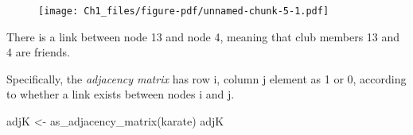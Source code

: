 \documentclass[
  letterpaper,
  DIV=11,
  numbers=noendperiod,
  oneside]{scrreprt}
\newenvironment{Shaded}{\begin{snugshade}}{\end{snugshade}}
\newcommand{\FunctionTok}[1]{\textcolor[rgb]{0.28,0.35,0.67}{#1}}
\newcommand{\NormalTok}[1]{\textcolor[rgb]{0.00,0.23,0.31}{#1}}
\newcommand{\OtherTok}[1]{\textcolor[rgb]{0.00,0.23,0.31}{#1}}
\begin{document}
\begin{figure}[H]

{\centering \texttt{[image: Ch1\_files/figure-pdf/unnamed-chunk-5-1.pdf]}

}

\end{figure}

There is a link between node 13 and node 4, meaning that club members 13
and 4 are friends.{}

Specifically, the \emph{adjacency matrix} has row i, column j element as
1 or 0, according to whether a link exists between nodes i and j.

\begin{Shaded}
\begin{Highlighting}[]
\NormalTok{adjK }\OtherTok{\textless{}{-}} \FunctionTok{as\_adjacency\_matrix}\NormalTok{(karate)}
\NormalTok{adjK}
\end{Highlighting}
\end{Shaded}
\end{document}
